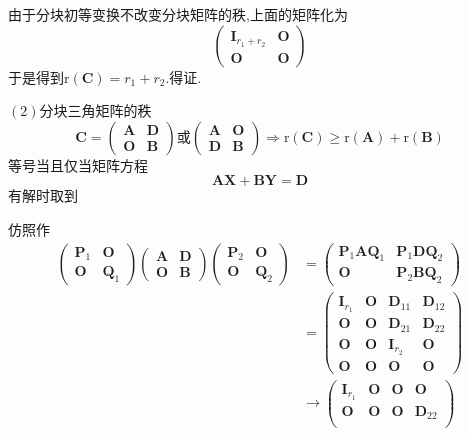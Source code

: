 \begin{formal}
\begin{theorem}[分块三角和分块对角阵]
\begin{Proof}
由于分块初等变换不改变分块矩阵的秩,上面的矩阵化为
\[
\begin{pmatrix}
    \bm{I}_{r_1+r_2}&\bm{O}\\
    \bm{O}&\bm{O}
\end{pmatrix}
\]
于是得到$\mathrm{r}\left(\bm{C}
\right)=r_1+r_2$.得证.
\end{Proof}
$(2)$分块三角矩阵的秩
\[
\bm{C}=
\begin{pmatrix}
    \bm{A} & \bm{D} \\
    \bm{O} & \bm{B}
\end{pmatrix}
\text{或}
\begin{pmatrix}
    \bm{A} & \bm{O} \\
    \bm{D} & \bm{B}
\end{pmatrix}
\Longrightarrow 
\mathrm{r}\left(\bm{C}
\right) \geqslant  \mathrm{r}\left(\bm{A}
\right)+\mathrm{r}\left(\bm{B}
\right)
\]
等号当且仅当矩阵方程
\[
\bm{AX}+\bm{BY} = \bm{D}
\]
有解时取到
\end{theorem}
\begin{Proof}
仿照作
\begin{align*}
\begin{pmatrix}
    \bm{P}_1&\bm{O}\\\bm{O}&\bm{Q}_1
\end{pmatrix}
\begin{pmatrix}
    \bm{A}&\bm{D}\\
    \bm{O}&\bm{B}
\end{pmatrix}
\begin{pmatrix}
    \bm{P}_2&\bm{O}\\\bm{O}&\bm{Q}_2
\end{pmatrix}
&=\begin{pmatrix}
    \bm{P}_1\bm{AQ}_1&\bm{P}_1\bm{DQ}_2\\
    \bm{O}&\bm{P}_2\bm{BQ}_2
\end{pmatrix}\\
&=\begin{pmatrix}
    \bm{I}_{r_1}&\bm{O}&\bm{D}_{11}&\bm{D}_{12}\\
    \bm{O}&\bm{O}&\bm{D}_{21}&\bm{D}_{22}\\
    \bm{O}&\bm{O}&\bm{I}_{r_2}&\bm{O}\\
    \bm{O}&\bm{O}&\bm{O}&\bm{O}
\end{pmatrix}\\
&\longrightarrow
\begin{pmatrix}
    \bm{I}_{r_1}&\bm{O}&\bm{O}&\bm{O}\\
    \bm{O}&\bm{O}&\bm{O}&\bm{D}_{22}\\

\end{pmatrix}
\end{align*}
\end{Proof}
\end{formal}
